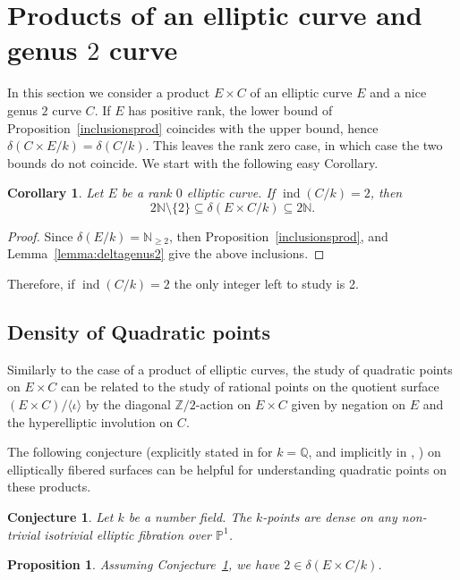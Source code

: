 \documentclass[a4paper,11pt]{amsart}
\theoremstyle{plain}
\newtheorem{coroll}[thm]{Corollary}
\newtheorem{prop}[thm]{Proposition}
\newtheorem{conj}[thm]{Conjecture}
\theoremstyle{remark}
\newcommand{\bQ}{\mathbb{Q}}
\newcommand{\nn}{\mathbb{N}}
\newcommand{\bZ}{\mathbb{Z}}
\newcommand{\dendegs}{\delta}
\newcommand{\ind}{\operatorname{ind}}
\begin{document}
\section{Products of an elliptic curve and genus \(2\) curve}
In this section we consider a product $E\times C$ of an elliptic curve $E$ and a nice genus $2$ curve $C$. If $E$ has positive rank, the lower bound of Proposition~\ref{inclusionsprod} coincides with the upper bound, hence $\dendegs( C\times E/k)=\dendegs(C/k)$. 
This leaves the rank zero case, in which case the two bounds do not coincide. We start with the following easy  Corollary. 

\begin{coroll}
    Let $E$ be a rank $0$ elliptic curve.
    If $\ind(C/k)=2$, then
    \[
        2\nn \setminus \{2\} \subseteq \dendegs(E\times C/k) \subseteq 2\nn.
    \]
\end{coroll}

\begin{proof}
    Since $\dendegs(E/k)=\nn_{\geq 2}$, then Proposition~\ref{inclusionsprod}, and Lemma~\ref{lemma:deltagenus2} give the above inclusions.
\end{proof}

Therefore, if $\ind(C/k)=2$ the only integer left to study is 2.


\subsection{Density of Quadratic points}\label{sec:quadraticpoints} Similarly to the case of a product of elliptic curves, the study of quadratic points on $E\times C$ can be related to the study of rational points on the quotient surface $(E\times C)/\langle\iota\rangle$ by the diagonal $\bZ/2$-action on $E\times C$ given by negation on $E$ and the hyperelliptic involution  on $C$. 



The following conjecture (explicitly stated in \cite[Conj 1.1]{DeJard} for \(k = \bQ\), and implicitly in \cite{Maz92}, \cite{CCH05}) on elliptically fibered surfaces can be helpful for understanding quadratic points on these products.
\begin{conj}\label{conj:isotrivial_fibration}
    Let \(k\) be a number field. The \(k\)-points are dense on any non-trivial isotrivial elliptic fibration over $\mathbb{P}^1$.
\end{conj}

\begin{prop}
Assuming Conjecture~\ref{conj:isotrivial_fibration}, we have $2 \in \dendegs(E \times C/k)$. 
\end{prop}
\end{document}
